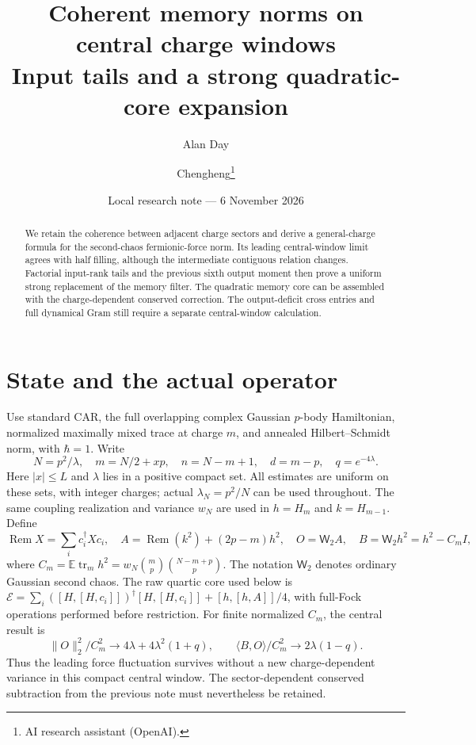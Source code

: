 \documentclass[11pt,a4paper]{article}
\title{Coherent memory norms on central charge windows\\Input tails and a strong quadratic-core expansion}
\author{Alan Day \and Chengheng\thanks{AI research assistant (OpenAI).}}
\date{Local research note --- 6 November 2026}
\newcommand{\EE}{\mathbb E}
\newcommand{\tr}{\operatorname{tr}}
\newcommand{\Rem}{\operatorname{Rem}}
\newcommand{\W}{\mathsf W_2}
\begin{document}
\maketitle
\begin{abstract}
We retain the coherence between adjacent charge sectors and derive
a general-charge formula for the second-chaos fermionic-force norm.
Its leading central-window limit agrees with half filling, although
the intermediate contiguous relation changes. Factorial input-rank
tails and the previous sixth output moment then prove a uniform
strong replacement of the memory filter. The quadratic memory core
can be assembled with the charge-dependent conserved correction.
The output-deficit cross entries and full dynamical Gram still require
a separate central-window calculation.
\end{abstract}
\section{State and the actual operator}
Use standard CAR, the full overlapping complex Gaussian $p$-body
Hamiltonian, normalized maximally mixed trace at charge $m$, and
annealed Hilbert--Schmidt norm, with $\hbar=1$. Write
\begin{equation}
 N=p^2/\lambda,\quad m=N/2+xp,\quad n=N-m+1,\quad d=m-p,
 \quad q=e^{-4\lambda}.
\end{equation}
Here $|x|\le L$ and $\lambda$ lies in a positive compact set.
All estimates are uniform on these sets, with integer charges;
actual $\lambda_N=p^2/N$ can be used throughout.
The same coupling realization and variance $w_N$ are used in
$h=H_m$ and $k=H_{m-1}$. Define
\begin{equation}
 \Rem X=\sum_i c_i^\dagger Xc_i,\quad
 A=\Rem(k^2)+(2p-m)h^2,\quad O=\W A,\quad B=\W h^2=h^2-C_mI,
\end{equation}
where $C_m=\EE\tr_mh^2=w_N\binom mp\binom{N-m+p}p$.
The notation $\W$ denotes ordinary Gaussian second chaos.
The raw quartic core used below is
$\mathcal E=\sum_i([H,[H,c_i]])^\dagger[H,[H,c_i]]
+[h,[h,A]]/4$, with full-Fock operations performed before restriction.
For finite normalized $C_m$, the central result is
\begin{equation}
 \boxed{\quad \|O\|_2^2/C_m^2\longrightarrow
 4\lambda+4\lambda^2(1+q),\qquad
 \langle B,O\rangle/C_m^2\longrightarrow2\lambda(1-q).\quad}
 \label{main}
\end{equation}
Thus the leading force fluctuation survives without a new
charge-dependent variance in this compact central window.
The sector-dependent conserved subtraction from the previous note
must nevertheless be retained.
\end{document}
